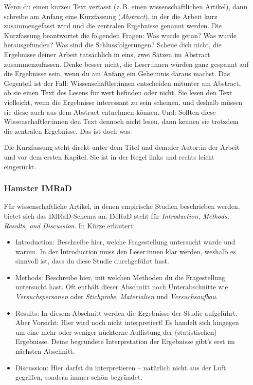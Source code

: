 \documentclass{../cssheet}
\begin{document}
Wenn du einen kurzen Text verfasst (z.\,B. einen wissenschaftlichen
Artikel), dann schreibe am Anfang eine Kurzfassung (\emph{Abstract}), in der
die Arbeit kurz zusammengefasst wird und die zentralen Ergebnisse
genannt werden. Die Kurzfassung beantwortet die folgenden Fragen: Was
wurde getan? Was wurde herausgefunden? Was sind die Schlussfolgerungen?
Scheue dich nicht, die Ergebnisse deiner Arbeit tatsächlich in eins,
zwei Sätzen im Abstract zusammenzufassen. Denke besser nicht, die Leser:innen
würden ganz gespannt auf die Ergebnisse sein, wenn du am Anfang ein
Geheimnis daraus machst. Das Gegenteil ist der Fall: Wissenschaftler:innen
entscheiden mitunter am Abstract, ob sie einen Text des Lesens für wert
befinden oder nicht. Sie lesen den Text vielleicht, wenn die Ergebnisse
interessant zu sein scheinen, und deshalb müssen sie diese auch aus dem
Abstract entnehmen können. Und: Sollten diese Wissenschaftler:innen den Text
dennoch nicht lesen, dann kennen sie trotzdem die zentralen Ergebnisse.
Das ist doch was.

Die Kurzfassung steht direkt unter dem Titel und dem:der Autor:in der Arbeit
und vor dem ersten Kapitel. Sie ist in der Regel links und rechts leicht eingerückt.

\subsubsection*{Hamster IMRaD}

Für wissenschaftliche Artikel, in denen empirische Studien beschrieben
werden, bietet sich das IMRaD-Schema an. IMRaD steht
für \emph{Introduction, Methods, Results, and Discussion}. In Kürze erläutert:

\begin{itemize}
\item
  Introduction: Beschreibe hier, welche Fragestellung untersucht wurde
  und warum. In der Introduction muss den Leser:innen klar
  werden, weshalb es sinnvoll ist, dass du diese Studie durchgeführt
  hast.
\item
  Methods: Beschreibe hier, mit welchen Methoden du die Fragestellung
  untersucht hast. Oft enthält dieser Abschnitt noch Unterabschnitte wie
  \emph{Versuchspersonen} oder \emph{Stichprobe}, \emph{Materialien} und
  \emph{Versuchsaufbau}.
\item
  Results: In diesem Abschnitt werden die Ergebnisse der Studie
  aufgeführt. Aber Vorsicht: Hier wird noch nicht interpretiert! Es
  handelt sich hingegen um eine mehr oder weniger nüchterne Auflistung
  der (statistischen) Ergebnisse. Deine begründete Interpretation der
  Ergebnisse gibt's erst im nächsten Abschnitt.
\item
  Discussion: Hier darfst du interpretieren -- natürlich nicht aus der
  Luft gegriffen, sondern immer schön begründet.
\end{itemize}
\end{document}
